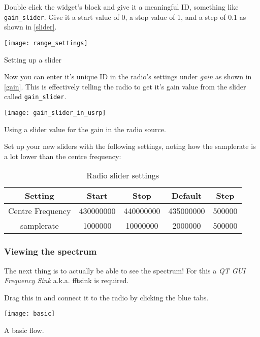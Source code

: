 
Double click the widget's block and give it a meaningful ID, something like \verb|gain_slider|. Give it a start value of 0, a stop value of 1, and a step of 0.1 as shown in \cref{slider}.

\centrefigurestart
\texttt{[image: range\_settings]}
\caption{Setting up a slider}
\label{slider}
\centrefigureend

Now you can enter it's unique ID in the radio's settings under \textit{gain} as shown in \cref{gain}. This is effectively telling the radio to get it's gain value from the slider called \verb|gain_slider|.

\centrefigurestart
\texttt{[image: gain\_slider\_in\_usrp]}
\caption{Using a slider value for the gain in the radio source.}
\label{gain}
\centrefigureend



Set up your new sliders with the following settings, noting how the \gls{samplerate} is a lot lower than the centre frequency:

\begin{center}
\begin{table}[H]
\begin{tabular}{|c|c|c|c|c|}
\hline
Setting & Start & Stop & Default & Step \\ \hline
Centre Frequency & 430000000 & 440000000 & 435000000 & 500000 \\ \hline
\Gls{samplerate} & 1000000 & 10000000 & 2000000 & 500000 \\ \hline
\end{tabular}
\caption{Radio slider settings}
\end{table}
\end{center}

\subsubsection{Viewing the spectrum}
The next thing is to actually be able to see the spectrum! For this a \textit{QT GUI Frequency Sink} a.k.a. \gls{fftsink} is required. 


Drag this in and connect it to the radio by clicking the blue tabs.

\centrefigurestart
\texttt{[image: basic]}
\caption{A basic flow.}
\label{basicflow}
\centrefigureend

